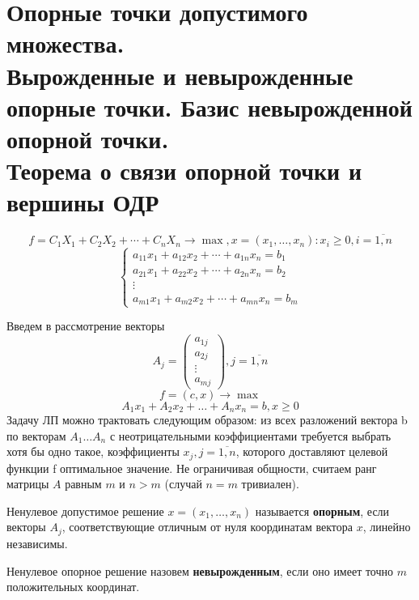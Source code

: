 \documentclass[17pt]{extarticle}
\begin{document}
\section{Опорные точки допустимого множества. \\ Вырожденные и невырожденные опорные точки.
  Базис невырожденной опорной точки. \\ Теорема о связи опорной точки и вершины ОДР}

\[f = C_1 X_1 + C_2 X_2 + \cdots + C_n X_n \rightarrow \max, x = (x_1, \ldots, x_n) \colon x_i \geq 0, i=\overline{1,n} \]
\[
    \begin{cases}
        a_{11}x_1 + a_{12}x_2 + \cdots + a_{1n}x_n = b_1 \\
        a_{21}x_1 + a_{22}x_2 + \cdots + a_{2n}x_n = b_2 \\
        \vdots                                           \\
        a_{m1}x_1 + a_{m2}x_2 + \cdots + a_{mn}x_n = b_m
    \end{cases}
\]

Введем в рассмотрение векторы
\[
    A_j = \begin{pmatrix}
        a_{1j} \\
        a_{2j} \\
        \vdots \\
        a_{mj}
    \end{pmatrix}, j=\overline{1,n}
\]
\[
    f = (c, x) \rightarrow \max
\]
\[
    A_1 x_1 + A_2 x_2 + \dots + A_n x_n = b, x \geq 0
\]
Задачу ЛП можно трактовать следующим образом: из всех разложений вектора b по
векторам $A_1 \dots A_n$ с неотрицательными коэффициентами требуется
выбрать хотя бы одно такое, коэффициенты $x_j, j=\overline{1,n}$,
которого доставляют целевой функции f оптимальное значение.
Не ограничивая общности, считаем ранг матрицы $A$ равным $m$ и $n>m$ (случай $n=m$ тривиален).

\begin{definition}
    Ненулевое допустимое решение \( x = (x_1, \ldots, x_n) \) называется \textbf{опорным},
    если векторы \( A_j \), соответствующие отличным от нуля координатам вектора \( x \), линейно независимы.
\end{definition}

\begin{definition}
    Ненулевое опорное решение назовем \textbf{невырожденным}, если оно имеет точно \( m \) положительных координат.
\end{definition}
\end{document}
